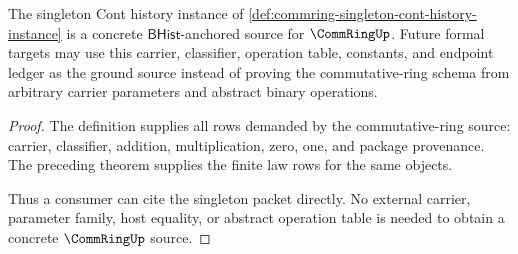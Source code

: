 \begin{theorem}
\label{thm:commring-singleton-cont-schema-unlock}
The singleton Cont history instance of
\autoref{def:commring-singleton-cont-history-instance} is a concrete
$\mathsf{BHist}$-anchored source for $\CommRingUp$. Future formal targets may
use this carrier, classifier, operation table, constants, and endpoint ledger
as the ground source instead of proving the commutative-ring schema from
arbitrary carrier parameters and abstract binary operations.
\end{theorem}
\begin{proof}
The definition supplies all rows demanded by the commutative-ring source:
carrier, classifier, addition, multiplication, zero, one, and package
provenance. The preceding theorem supplies the finite law rows for the same
objects.

Thus a consumer can cite the singleton packet directly. No external carrier,
parameter family, host equality, or abstract operation table is needed to
obtain a concrete $\CommRingUp$ source.
\end{proof}
